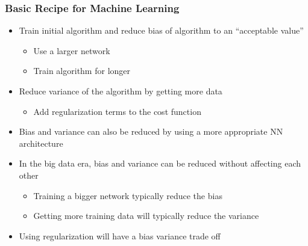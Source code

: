 \documentclass[12pt, letterpaper]{article}
\begin{document}
    \subsubsection{Basic Recipe for Machine Learning}
    \begin{itemize}
        \item Train initial algorithm and reduce bias of algorithm to an ``acceptable value''
        \begin{itemize}
            \item Use a larger network 
            \item Train algorithm for longer
        \end{itemize}
        \item Reduce variance of the algorithm by getting more data
        \begin{itemize}
            \item Add regularization terms to the cost function
        \end{itemize}
        \item Bias and variance can also be reduced by using a more appropriate NN architecture
        \item In the big data era, bias and variance can be reduced without affecting each other
        \begin{itemize}
            \item Training a bigger network typically reduce the bias 
            \item Getting more training data will typically reduce the variance
        \end{itemize}
        \item Using regularization will have a bias variance trade off
    \end{itemize}
\end{document}
